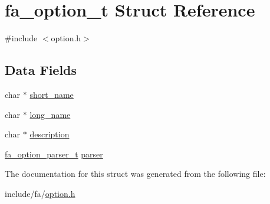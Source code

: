 \hypertarget{structfa__option__t}{\section{fa\-\_\-option\-\_\-t Struct Reference}
\label{structfa__option__t}
}


{\ttfamily \#include $<$option.\-h$>$}

\subsection*{Data Fields}
\begin{DoxyCompactItemize}
\item 
char $\ast$ \hyperlink{group___fa_ga818460ed5f56b58797c07bfb6bb10d6a}{short\-\_\-name}
\item 
char $\ast$ \hyperlink{group___fa_gae7a1b4c3da8aefdbbb6c2a6ff624f087}{long\-\_\-name}
\item 
char $\ast$ \hyperlink{group___fa_ga936f10abd2205b7df24c75393cdb7430}{description}
\item 
\hyperlink{group___fa_option_ga86aa8e13dfaaa7e6870855b204cfe3a0}{fa\-\_\-option\-\_\-parser\-\_\-t} \hyperlink{group___fa_ga8df01e050bbe5ea4186eb6b84707245d}{parser}
\end{DoxyCompactItemize}


The documentation for this struct was generated from the following file\-:\begin{DoxyCompactItemize}
\item 
include/fa/\hyperlink{option_8h}{option.\-h}\end{DoxyCompactItemize}

